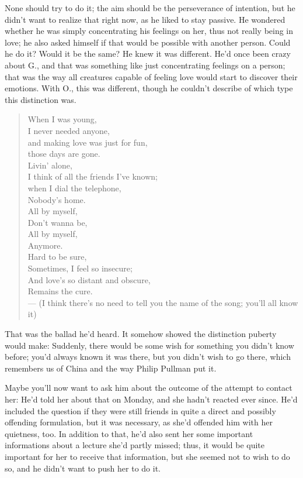 None should try to do it; the aim should be the perseverance of intention, but he didn't want to realize that right now, as he liked to stay passive. 
He wondered whether he was simply concentrating his feelings on her, thus not really being in love; he also asked himself if that would be possible with another person. Could he do it? Would it be the same?
He knew it was different. He'd once been crazy about G., and that was something like just concentrating feelings on a person; that was the way all creatures capable of feeling love would start to discover their emotions. With O., this was different, though he couldn't describe of which type this distinction was.
\begin{quote}
When I was young,\\
I never needed anyone,\\
and making love was just for fun,\\
those days are gone. \\[1\baselineskip]

Livin' alone,\\
I think of all the friends I've known;\\
when I dial the telephone,\\
Nobody's home. \\[1\baselineskip]

All by myself,\\
Don't wanna be,\\
All by myself,\\
Anymore. \\[1\baselineskip]

Hard to be sure,\\
Sometimes, I feel so insecure;\\
And love's so distant and obscure,\\
Remains the cure.\\
--- (I think there's no need to tell you the name of the song; you'll all know it)
\end{quote}
That was the ballad he'd heard. 
It somehow showed the distinction puberty would make: Suddenly, there would be some wish for something you didn't know before; you'd always known it was there, but you didn't wish to go there, which remembers us of China and the way Philip Pullman put it.

Maybe you'll now want to ask him about the outcome of the attempt to contact her: He'd told her about that on Monday, and she hadn't reacted ever since. He'd included the question if they were still friends in quite a direct and possibly offending formulation, but it was necessary, as she'd offended him with her quietness, too. In addition to that, he'd also sent her some important informations about a lecture she'd partly missed; thus, it would be quite important for her to receive that information, but she seemed not to wish to do so, and he didn't want to push her to do it.

